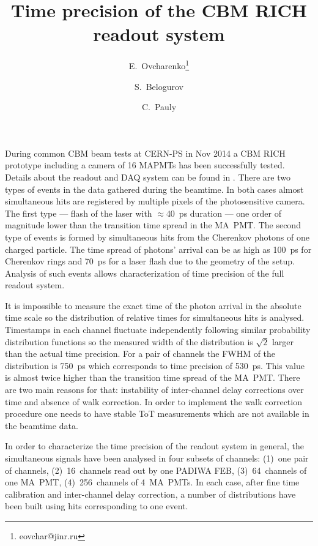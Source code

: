 \documentclass{JACoW-GSI-2015}
\begin{document}
\title{Time precision of the CBM RICH readout system}

\author[1]{E.~Ovcharenko\thanks{eovchar@jinr.ru}}
\author[1]{S.~Belogurov}
\author[2]{C.~Pauly}


\maketitle

During common CBM beam tests at CERN-PS in Nov 2014 a CBM RICH prototype including a camera of 16 MAPMTs has been successfully tested. Details about the readout and DAQ system can be found in \cite{RICH2016, PEPANL}. There are two types of events in the data gathered during the beamtime. In both cases almost simultaneous hits are registered by multiple pixels of the photosensitive camera. The first type --- flash of the laser with $\approx$40~ps duration --- one order of magnitude lower than the transition time spread in the MA~PMT. The second type of events is formed by simultaneous hits from the Cherenkov photons of one charged particle. The time spread of photons' arrival can be as high as 100~ps for Cherenkov rings and 70~ps for a laser flash due to the geometry of the setup. Analysis of such events allows characterization of time precision of the full readout system.

It is impossible to measure the exact time of the photon arrival in the absolute time scale so the distribution of relative times for simultaneous hits is analysed. Timestamps in each channel fluctuate independently following similar probability distribution functions so the measured width of the distribution is $\sqrt 2$ larger than the actual time precision. For a pair of channels the FWHM of the distribution is 750~ps which corresponds to time precision of 530~ps. This value is almost twice higher than the transition time spread of the MA~PMT. There are two main reasons for that: instability of inter-channel delay corrections over time and absence of walk correction. In order to implement the walk correction procedure one needs to have stable ToT measurements which are not available in the beamtime data.

In order to characterize the time precision of the readout system in general, the simultaneous signals have been analysed in four subsets of channels: (1)~one pair of channels, (2)~16~channels read out by one PADIWA FEB, (3)~64~channels of one MA~PMT, (4)~256~channels of 4~MA~PMTs. In each case, after fine time calibration and inter-channel delay correction, a number of distributions have been built using hits corresponding to one event.
\end{document}
